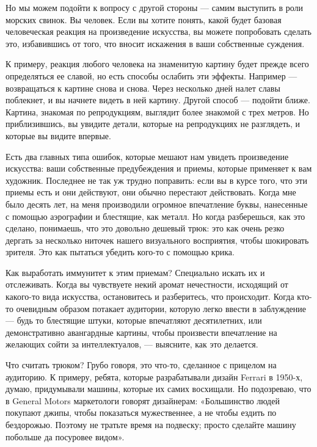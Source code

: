 \documentclass[ebook,12pt,oneside,openany]{memoir}
\begin{document}
Но мы можем подойти к вопросу с другой стороны — самим выступить в
роли морских свинок. Вы человек. Если вы хотите понять, какой будет
базовая человеческая реакция на произведение искусства, вы можете
попробовать сделать это, избавившись от того, что вносит искажения в
ваши собственные суждения. \newline

К примеру, реакция любого человека на знаменитую картину будет прежде
всего определяться ее славой, но есть способы ослабить эти эффекты.
Например — возвращаться к картине снова и снова. Через несколько дней
налет славы поблекнет, и вы начнете видеть в ней картину. Другой
способ — подойти ближе. Картина, знакомая по репродукциям, выглядит
более знакомой с трех метров. Но приблизившись, вы увидите детали,
которые на репродукциях не разглядеть, и которые вы видите впервые. \newline

Есть два главных типа ошибок, которые мешают нам увидеть произведение
искусства: ваши собственные предубеждения и приемы, которые применяет
к вам художник. Последнее не так уж трудно поправить: если вы в курсе
того, что эти приемы есть и они действуют, они обычно перестают
действовать. Когда мне было десять лет, на меня производили огромное
впечатление буквы, нанесенные с помощью аэрографии и блестящие, как
металл. Но когда разберешься, как это сделано, понимаешь, что это
довольно дешевый трюк: это как очень резко дергать за несколько
ниточек нашего визуального восприятия, чтобы шокировать зрителя. Это
как пытаться убедить кого-то с помощью крика. \newline

Как выработать иммунитет к этим приемам? Специально искать их и
отслеживать. Когда вы чувствуете некий аромат нечестности, исходящий
от какого-то вида искусства, остановитесь и разберитесь, что
происходит. Когда кто-то очевидным образом потакает аудитории, которую
легко ввести в заблуждение — будь то блестящие штуки, которые
впечатляют десятилетних, или демонстративно авангардные картины, чтобы
произвести впечатление на желающих сойти за интеллектуалов, —
выясните, как это делается. \newline

Что считать трюком? Грубо говоря, это что-то, сделанное с прицелом на
аудиторию. К примеру, ребята, которые разрабатывали дизайн Ferrari в
1950-х, думаю, придумывали машины, которые их самих восхищали. Но
подозреваю, что в General Motors маркетологи говорят дизайнерам:
«Большинство людей покупают джипы, чтобы показаться мужественнее, а не
чтобы ездить по бездорожью. Поэтому не тратьте время на подвеску;
просто сделайте машину побольше да посуровее видом». \newline
\end{document}
